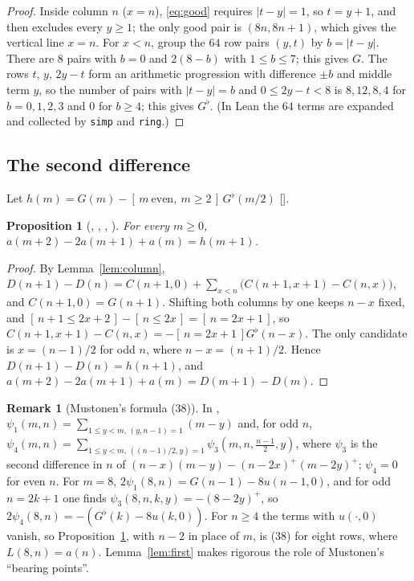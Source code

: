 \documentclass[11pt]{amsart}
\theoremstyle{plain}
\newtheorem{proposition}[theorem]{Proposition}
\theoremstyle{definition}
\newtheorem{remark}[theorem]{Remark}
\newcommand{\Gb}{G^{\flat}}
\newcommand{\ind}[1]{[\,#1\,]}
\begin{document}
\begin{proof}
Inside column $n$ ($x=n$), \eqref{eq:good} requires $|t-y|=1$, so $t=y+1$, and then excludes every $y\ge1$; the only good pair is $(8n,8n+1)$, which gives the vertical line $x=n$. For $x<n$, group the $64$ row pairs $(y,t)$ by $b=|t-y|$. There are $8$ pairs with $b=0$ and $2(8-b)$ with $1\le b\le7$; this gives $G$. The rows $t$, $y$, $2y-t$ form an arithmetic progression with difference $\pm b$ and middle term $y$, so the number of pairs with $|t-y|=b$ and $0\le2y-t<8$ is $8,12,8,4$ for $b=0,1,2,3$ and $0$ for $b\ge4$; this gives $\Gb$. (In Lean the $64$ terms are expanded and collected by \texttt{simp} and \texttt{ring}.)
\end{proof}

\subsection{The second difference}
Let $h(m)=G(m)-\ind{m\ \text{even},\ m\ge2}\,\Gb(m/2)$ [].

\begin{proposition}[, , , ]\label{prop:second}
For every $m\ge0$, $a(m+2)-2a(m+1)+a(m)=h(m+1)$.
\end{proposition}

\begin{proof}
By Lemma~\ref{lem:column}, $D(n+1)-D(n)=C(n+1,0)+\sum_{x<n}\bigl(C(n+1,x+1)-C(n,x)\bigr)$, and $C(n+1,0)=G(n+1)$. Shifting both columns by one keeps $n-x$ fixed, and $\ind{n+1\le2x+2}-\ind{n\le2x}=\ind{n=2x+1}$, so $C(n+1,x+1)-C(n,x)=-\ind{n=2x+1}\Gb(n-x)$. The only candidate is $x=(n-1)/2$ for odd $n$, where $n-x=(n+1)/2$. Hence $D(n+1)-D(n)=h(n+1)$, and $a(m+2)-2a(m+1)+a(m)=D(m+1)-D(m)$.
\end{proof}

\begin{remark}[Mustonen's formula (38)]\label{rem:mustonen}
In \cite{Mustonen}, $\psi_1(m,n)=\sum_{1\le y<m,\,(y,n-1)=1}(m-y)$ and, for odd $n$, $\psi_4(m,n)=\sum_{1\le y<m,\,((n-1)/2,y)=1}\psi_3(m,n,\tfrac{n-1}2,y)$, where $\psi_3$ is the second difference in $n$ of $(n-x)(m-y)-(n-2x)^+(m-2y)^+$; $\psi_4=0$ for even $n$. For $m=8$, $2\psi_1(8,n)=G(n-1)-8u(n-1,0)$, and for odd $n=2k+1$ one finds $\psi_3(8,n,k,y)=-(8-2y)^+$, so $2\psi_4(8,n)=-(\Gb(k)-8u(k,0))$. For $n\ge4$ the terms with $u(\cdot,0)$ vanish, so Proposition~\ref{prop:second}, with $n-2$ in place of $m$, is (38) for eight rows, where $L(8,n)=a(n)$. Lemma~\ref{lem:first} makes rigorous the role of Mustonen's ``bearing points''.
\end{remark}
\end{document}
